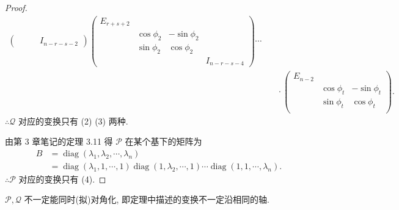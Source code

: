 \documentclass{ctexart}
\begin{document}
\begin{proof}
\begin{align*}
\begin{pmatrix}
            &&& I_{n-r-s-2}
        \end{pmatrix}\begin{pmatrix}
            E_{r+s+2} \\
            & \cos\phi_2 & -\sin\phi_2 \\
            & \sin\phi_2 & \cos\phi_2 \\
            &&& I_{n-r-s-4}
        \end{pmatrix}\cdots \\
        & \quad\cdot\begin{pmatrix}
            E_{n-2} \\
            & \cos\phi_t & -\sin\phi_t \\
            & \sin\phi_t & \cos\phi_t \\
        \end{pmatrix}.
    \end{align*}
    $\therefore\mathcal{Q}$ 对应的变换只有 (2) (3) 两种.

    由第 3 章笔记的定理 3.11 得 $\mathcal{P}$ 在某个基下的矩阵为
    \begin{align*}
        B & =\operatorname{diag}(\lambda_1,\lambda_2,\cdots,\lambda_n) \\
        & =\operatorname{diag}(\lambda_1,1,\cdots,1)\operatorname{diag}(1,\lambda_2,\cdots,1)\cdots\operatorname{diag}(1,1,\cdots,\lambda_n).
    \end{align*}
    $\therefore\mathcal{P}$ 对应的变换只有 (4).
\end{proof}
\begin{note}
    $\mathcal{P},\mathcal{Q}$ 不一定能同时(拟)对角化, 即定理中描述的变换不一定沿相同的轴.
\end{note}
\end{document}
